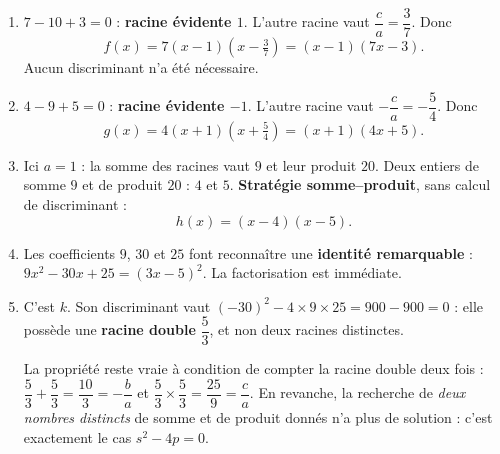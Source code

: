 

\begin{enumerate}
  \item[\textbf{a.}] $7 - 10 + 3 = 0$ : \textbf{racine évidente $1$}. L'autre
        racine vaut $\dfrac{c}{a} = \dfrac{3}{7}$. Donc
        \[
          f(x) = 7(x - 1)\left(x - \tfrac{3}{7}\right) = (x - 1)(7x - 3).
        \]
        Aucun discriminant n'a été nécessaire.

  \item[\textbf{b.}] $4 - 9 + 5 = 0$ : \textbf{racine évidente $-1$}. L'autre
        racine vaut $-\dfrac{c}{a} = -\dfrac{5}{4}$. Donc
        \[
          g(x) = 4(x + 1)\left(x + \tfrac{5}{4}\right) = (x + 1)(4x + 5).
        \]

  \item[\textbf{c.}] Ici $a = 1$ : la somme des racines vaut $9$ et leur produit
        $20$. Deux entiers de somme $9$ et de produit $20$ : $4$ et $5$.
        \textbf{Stratégie somme–produit}, sans calcul de discriminant :
        \[
          h(x) = (x - 4)(x - 5).
        \]

  \item[\textbf{d.}] Les coefficients $9$, $30$ et $25$ font reconnaître une
        \textbf{identité remarquable} : $9x^2 - 30x + 25 = (3x - 5)^2$. La
        factorisation est immédiate.

  \item[\textbf{e.}] C'est $k$. Son discriminant vaut
        $(-30)^2 - 4 \times 9 \times 25 = 900 - 900 = 0$ : elle possède une
        \textbf{racine double} $\dfrac{5}{3}$, et non deux racines distinctes.

        La propriété reste vraie à condition de compter la racine double deux
        fois : $\dfrac{5}{3} + \dfrac{5}{3} = \dfrac{10}{3} = -\dfrac{b}{a}$ et
        $\dfrac{5}{3} \times \dfrac{5}{3} = \dfrac{25}{9} = \dfrac{c}{a}$. En
        revanche, la recherche de \emph{deux nombres distincts} de somme et de
        produit donnés n'a plus de solution : c'est exactement le cas
        $s^2 - 4p = 0$.
\end{enumerate}
